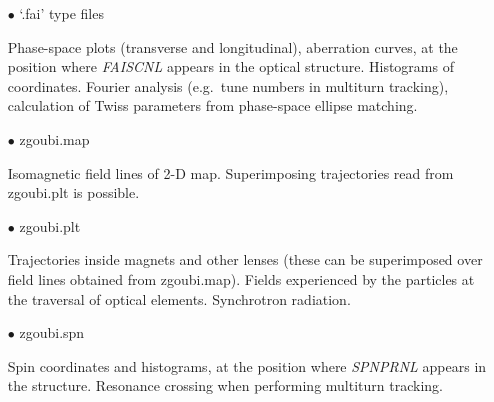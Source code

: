 \begin{itemize}
\item[$\bullet$] `.fai' type files 
  
  Phase-space plots (transverse and longitudinal), 
aberration curves, at the position where \textsl{FAISCNL} 
appears in the 
optical structure. Histograms of coordinates. Fourier analysis 
(e.g.~tune numbers in multiturn tracking), calculation of Twiss parameters from 
phase-space 
ellipse matching.
\item[$\bullet$] zgoubi.map 
  
  Isomagnetic field lines of  2-D map. Superimposing 
trajectories read from zgoubi.plt is possible.
\item[$\bullet$] zgoubi.plt 
  
Trajectories inside magnets and other lenses (these can 
be superimposed over field lines obtained from zgoubi.map). 
Fields experienced by the particles at the traversal of optical 
elements. Synchrotron radiation.
\item[$\bullet$] zgoubi.spn
  
Spin coordinates and histograms, at the position where 
\textsl{SPNPRNL} appears in the structure. Resonance crossing when 
performing multiturn tracking. 
\end{itemize}



